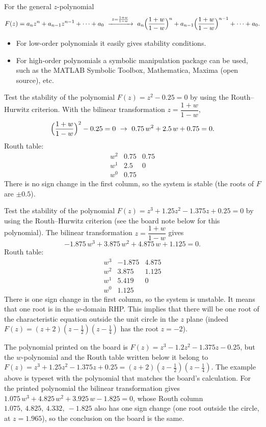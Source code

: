 For the general $z$-polynomial
\[
  F(z)=a_nz^{n}+a_{n-1}z^{n-1}+\cdots+a_0\ \xrightarrow{\ z=\frac{1+w}{1-w}\ }\
  a_n\Bigl(\frac{1+w}{1-w}\Bigr)^{n}+a_{n-1}\Bigl(\frac{1+w}{1-w}\Bigr)^{n-1}+\cdots+a_0.
\]
\begin{itemize}
  \item For low-order polynomials it easily gives stability conditions.
  \item For high-order polynomials a symbolic manipulation package can be used, such as the MATLAB Symbolic
        Toolbox, Mathematica, Maxima (open source), etc.
\end{itemize}

\begin{example}
Test the stability of the polynomial $F(z)=z^{2}-0.25=0$ by using the Routh--Hurwitz criterion. With the
bilinear transformation $z=\dfrac{1+w}{1-w}$,
\[
  \Bigl(\frac{1+w}{1-w}\Bigr)^{2}-0.25=0\ \to\ 0.75\,w^{2}+2.5\,w+0.75=0.
\]
Routh table:
\[
\begin{array}{c|cc}
w^{2}&0.75&0.75\\
w^{1}&2.5&0\\
w^{0}&0.75&
\end{array}
\]
There is no sign change in the first column, so the system is stable (the roots of $F$ are $\pm0.5$).
\end{example}

\begin{example}
Test the stability of the polynomial $F(z)=z^{3}+1.25z^{2}-1.375z+0.25=0$ by using the Routh--Hurwitz criterion
(see the board note below for this polynomial). The bilinear transformation $z=\dfrac{1+w}{1-w}$ gives
\[
  -1.875\,w^{3}+3.875\,w^{2}+4.875\,w+1.125=0.
\]
Routh table:
\[
\begin{array}{c|cc}
w^{3}&-1.875&4.875\\
w^{2}&3.875&1.125\\
w^{1}&5.419&0\\
w^{0}&1.125&
\end{array}
\]
There is one sign change in the first column, so the system is unstable. It means that one root is in the
$w$-domain RHP. This implies that there will be one root of the characteristic equation outside the unit
circle in the $z$ plane (indeed $F(z)=(z+2)(z-\tfrac12)(z-\tfrac14)$ has the root $z=-2$).
\end{example}

\begin{boardnote}
The polynomial printed on the board is $F(z)=z^{3}-1.2z^{2}-1.375z-0.25$, but the $w$-polynomial and the Routh
table written below it belong to $F(z)=z^{3}+1.25z^{2}-1.375z+0.25=(z+2)(z-\tfrac12)(z-\tfrac14)$. The
example above is typeset with the polynomial that matches the board's calculation. For the printed
polynomial the bilinear transformation gives $1.075\,w^{3}+4.825\,w^{2}+3.925\,w-1.825=0$, whose Routh column
$1.075,\ 4.825,\ 4.332,\ -1.825$ also has one sign change (one root outside the circle, at $z=1.965$), so the
conclusion on the board is the same.
\end{boardnote}

